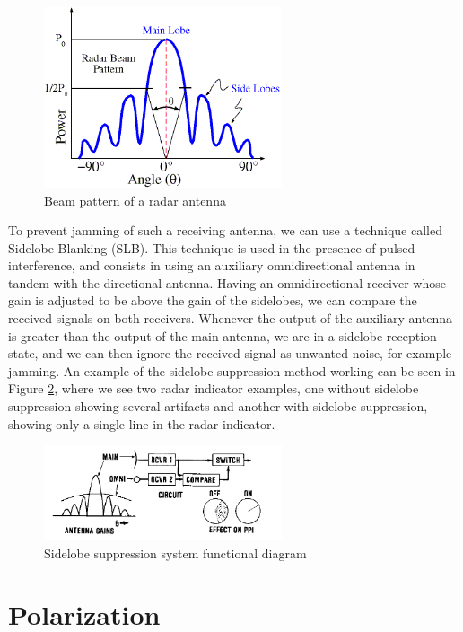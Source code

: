 \documentclass[english,purist]{ist-report}
\begin{document}
\begin{figure}[ht]
\centering
\includegraphics[width=70mm]{radar_antenna_lobes.png}
\caption{Beam pattern of a radar antenna}
\label{target1}
\end{figure} 

To prevent jamming of such a receiving antenna, we can use a technique called Sidelobe Blanking (SLB). This technique is used in the presence of pulsed interference, and consists in using an auxiliary omnidirectional antenna in tandem with the directional antenna. Having an omnidirectional receiver whose gain is adjusted to be above the gain of the sidelobes, we can compare the received signals on both receivers. Whenever the output of the auxiliary antenna is greater than the output of the main antenna, we are in a sidelobe reception state, and we can then ignore the received signal as unwanted noise, for example jamming. An example of the sidelobe suppression method working can be seen in Figure \ref{sidelobe_suppression}, where we see two radar indicator examples, one without sidelobe suppression showing several artifacts and another with sidelobe suppression, showing only a single line in the radar indicator.

\begin{figure}[ht]
\centering
\includegraphics[width=70mm]{sidelobe_suppresion.png}
\caption{Sidelobe suppression system functional diagram}
\label{sidelobe_suppression}
\end{figure} 

\section{Polarization}
\end{document}
